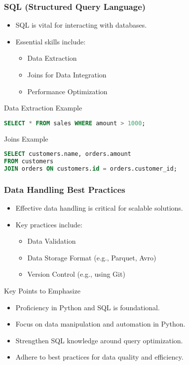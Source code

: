 \documentclass[aspectratio=169]{beamer}
\begin{document}
\begin{frame}[fragile]
  \frametitle{SQL (Structured Query Language)}
  \begin{itemize}
    \item SQL is vital for interacting with databases.
    \item Essential skills include:
      \begin{itemize}
        \item Data Extraction
        \item Joins for Data Integration
        \item Performance Optimization
      \end{itemize}
  \end{itemize}
  
  \begin{block}{Data Extraction Example}
    \begin{lstlisting}[language=SQL]
SELECT * FROM sales WHERE amount > 1000;
    \end{lstlisting}
  \end{block}

  \begin{block}{Joins Example}
    \begin{lstlisting}[language=SQL]
SELECT customers.name, orders.amount 
FROM customers 
JOIN orders ON customers.id = orders.customer_id;
    \end{lstlisting}
  \end{block}
\end{frame}

\begin{frame}
  \frametitle{Data Handling Best Practices}
  \begin{itemize}
    \item Effective data handling is critical for scalable solutions.
    \item Key practices include:
      \begin{itemize}
        \item Data Validation
        \item Data Storage Format (e.g., Parquet, Avro)
        \item Version Control (e.g., using Git)
      \end{itemize}
  \end{itemize}

  \begin{block}{Key Points to Emphasize}
    \begin{itemize}
      \item Proficiency in Python and SQL is foundational.
      \item Focus on data manipulation and automation in Python.
      \item Strengthen SQL knowledge around query optimization.
      \item Adhere to best practices for data quality and efficiency.
    \end{itemize}
  \end{block}
\end{frame}
\end{document}
